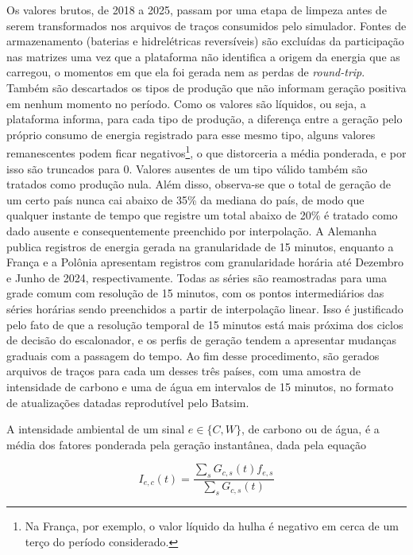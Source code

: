Os valores brutos, de 2018 a 2025, passam por uma etapa de limpeza antes de serem
transformados nos arquivos de traços consumidos pelo simulador. Fontes de armazenamento (baterias e hidrelétricas reversíveis) 
são excluídas da participação nas matrizes uma vez que a plataforma não identifica a origem da energia que as carregou,
o momentos em que ela foi gerada nem as perdas de \textit{round-trip}. Também são descartados os tipos de produção
que não informam geração positiva em nenhum momento no período. Como os valores são líquidos, ou seja, a plataforma 
informa, para cada tipo de produção, a diferença entre a geração pelo próprio consumo de energia registrado para esse mesmo tipo, alguns valores remanescentes
podem ficar negativos\footnote{Na França, por exemplo, o valor líquido da hulha é negativo em cerca de um terço do período considerado.}, 
o que distorceria a média ponderada, e por isso são truncados para 0. Valores ausentes de um tipo válido também são tratados 
como produção nula. Além disso, observa-se que o total de geração de um certo país nunca cai abaixo de 
35\% da mediana do país, de modo que qualquer instante de tempo que registre um total abaixo de 20\% 
é tratado como dado ausente e consequentemente preenchido por interpolação. A Alemanha
publica registros de energia gerada na granularidade de 15 minutos, enquanto a França e a Polônia apresentam registros com granularidade horária
até Dezembro e Junho de 2024, respectivamente. Todas as séries são reamostradas para uma grade comum com resolução de 15 minutos, com os pontos intermediários das séries 
horárias sendo preenchidos a partir de interpolação linear. Isso é justificado pelo fato de que a resolução temporal de 15 
minutos está mais próxima dos ciclos de decisão do escalonador, e os perfis de geração
tendem a apresentar mudanças graduais com a passagem do tempo. Ao fim desse procedimento, são gerados arquivos de traços para cada um
desses três países, com uma amostra de intensidade de carbono e uma de água em intervalos de 15 minutos, no formato de atualizações
datadas reprodutível pelo Batsim.

A intensidade ambiental de um sinal $e \in \{C, W\}$, de carbono ou de água, é a média dos fatores ponderada pela geração instantânea, 
dada pela equação

\begin{equation*}
    I_{e,c}(t) = \frac{\sum_{s}G_{c,s}(t)f_{e,s}}{\sum_{s}G_{c,s}(t)}
    \label{eq:intensidade-ambiental-pais}
\end{equation*}

